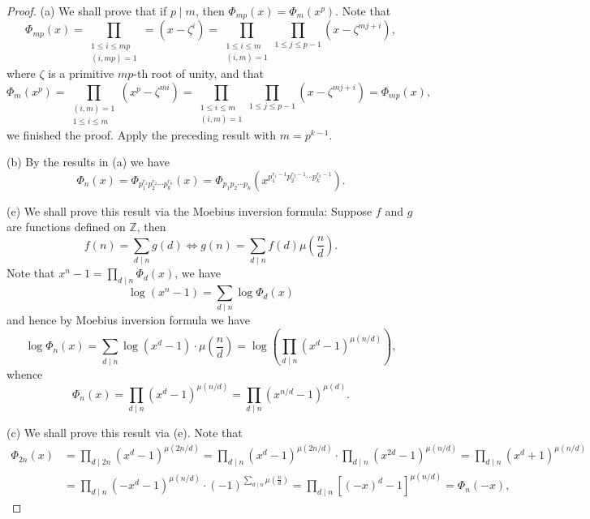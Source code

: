 \begin{proof}
(a) We shall prove that if $p\mid m$, then $\Phi_{mp}(x)=\Phi_m(x^p)$. Note that 
$$
\Phi _{mp}\left( x \right) =\prod_{\substack{1\le i\le mp \\ \left( i,mp \right) =1}}=\left( x-\zeta ^i \right)=\prod_{\substack{1\le i\le m \\ \left( i,m \right) =1}}\prod_{1\le j\le p-1}{\left( x-\zeta ^{mj+i} \right)},
$$
where $\zeta$ is a primitive $mp$-th root of unity, and that 
$$
\Phi _m\left( x^p \right) =\prod_{\substack{\left( i,m \right) =1 \\ 1\le i\le m}}\left( x^p-\zeta ^{mi} \right)=\prod_{\substack{1\le i\le m \\ \left( i,m \right) =1}}\prod_{1\le j\le p-1}{\left( x-\zeta ^{mj+i} \right)}=\Phi _{mp}\left( x \right) ,
$$
we finished the proof. Apply the preceding result with $m=p^{k-1}$.\par
(b) By the results in (a) we have 
$$
\Phi _n\left( x \right) =\Phi _{p_{1}^{r_1}p_{2}^{r_2}\cdots p_{k}^{r_k}}\left( x \right) =\Phi _{p_1p_2\cdots p_k}\left( x^{p_{1}^{r_1-1}p_{2}^{r_2-1}\cdots p_{k}^{r_k-1}} \right) .
$$\par
(e) We shall prove this result via the Moebius inversion formula: Suppose $f$ and $g$ are functions defined on $\mathbb{Z}$, then 
$$
f\left( n \right) =\sum_{d\mid n}{g\left( d \right)}\Longleftrightarrow g\left( n \right) =\sum_{d\mid n}{f\left( d \right) \mu \left( \frac{n}{d} \right)}.
$$
Note that $x^n-1=\prod_{d\mid n}{\Phi _d\left( x \right)}$, we have 
$$
\log \left( x^n-1 \right) =\sum_{d\mid n}{\log \Phi _d\left( x \right)}
$$
and hence by Moebius inversion formula we have 
$$
\log \Phi _n\left( x \right) =\sum_{d\mid n}{\log \left( x^d-1 \right) \cdot \mu \left( \frac{n}{d} \right)}=\log \left( \prod_{d\mid n}{\left( x^d-1 \right) ^{\mu \left( n/d \right)}} \right) ,
$$
whence 
$$
\Phi _n\left( x \right) =\prod_{d\mid n}{\left( x^d-1 \right) ^{\mu \left( n/d \right)}}=\prod_{d\mid n}{\left( x^{n/d}-1 \right) ^{\mu \left( d \right)}}.
$$\par
(c) We shall prove this result via (e). Note that 
$$
\begin{aligned}
\Phi _{2n}\left( x \right) &=\prod_{d\mid 2n}{\left( x^d-1 \right) ^{\mu \left( 2n/d \right)}}=\prod_{d\mid n}{\left( x^d-1 \right) ^{\mu \left( 2n/d \right)}}\cdot \prod_{d\mid n}{\left( x^{2d}-1 \right) ^{\mu \left( n/d \right)}}=\prod_{d\mid n}{\left( x^d+1 \right) ^{\mu \left( n/d \right)}}
\\
&=\prod_{d\mid n}{\left( -x^d-1 \right) ^{\mu \left( n/d \right)}}\cdot \left( -1 \right) ^{\sum_{d\mid n}{\mu \left( \frac{n}{d} \right)}}=\prod_{d\mid n}{\left[ \left( -x \right) ^d-1 \right] ^{\mu \left( n/d \right)}}=\Phi _n\left( -x \right) ,

\end{aligned}$$
\end{proof}
